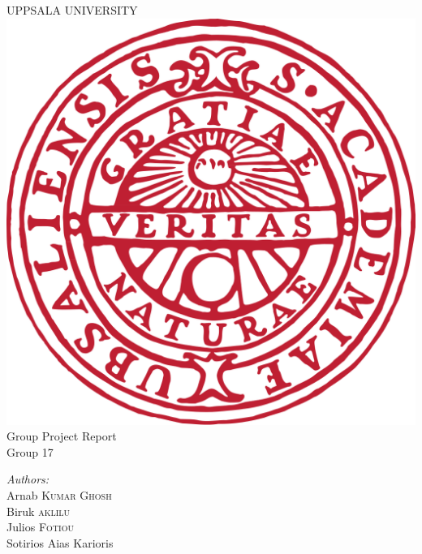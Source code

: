 \documentclass[12pt]{report}
\begin{document}
\begin{titlepage}

\newcommand{\HRule}{\rule{\linewidth}{0.5mm}} %

\center %
 

 \textsc{\LARGE UPPSALA UNIVERSITY}\\[1.5cm]%
\includegraphics[scale=.1]{Uppsala_University_seal_svg.png}\\[1cm]
 


{ \huge Group Project Report}\\[0.5cm]
\huge Group 17\\[1cm]%
 

\begin{minipage}{0.4\textwidth}
\begin{flushleft} \large
\emph{Authors:}\\
Arnab   \textsc{Kumar} \textsc{Ghosh}\\ 
Biruk \textsc{aklilu}\\ 
Julios   \textsc{Fotiou}\\
Sotirios \textsc Aias \textsc Karioris  \\%
\end{flushleft}


\end{minipage}
\end{titlepage}
\end{document}
